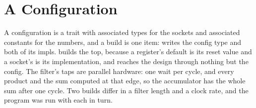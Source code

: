 \section{A Configuration}
\label{sec:x-config}

A configuration is a trait with associated types for the sockets and
associated constants for the numbers, and a build is one item:
 writes the config type and both of its impls.
 builds the top, because a register's default is its
reset value and a socket's is its implementation, and 
reaches the design through nothing but the config. The filter's taps
are parallel hardware: one wait per cycle, and every product and the
sum computed at that edge, so the accumulator has the whole sum after
one cycle. Two builds differ in a filter length and a clock rate, and
the program was run with each in turn.




